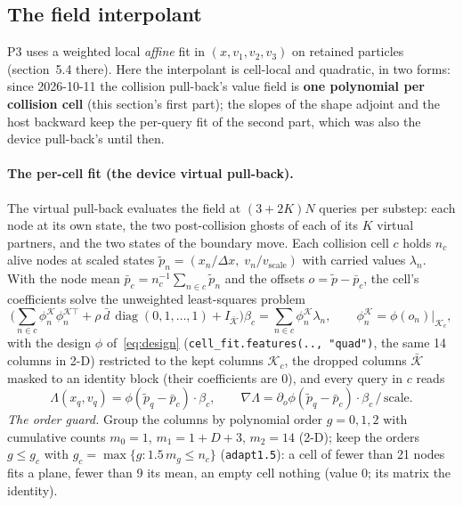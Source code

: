 \documentclass[11pt,a4paper]{article}
\numberwithin{equation}{section}
\newcommand{\code}[1]{\texttt{#1}}
\newcommand{\Lam}{\Lambda}
\begin{document}
\subsection{The field interpolant}
\label{sec:field}

P3 uses a weighted local \emph{affine} fit in $(x, v_1, v_2, v_3)$ on retained
particles (section~5.4 there).  Here the interpolant is cell-local and quadratic, in two
forms: since 2026-10-11 the collision pull-back's value field is \textbf{one polynomial per
collision cell} (this section's first part); the slopes of the shape adjoint and the host
backward keep the per-query fit of the second part, which was also the device pull-back's
until then.

\paragraph{The per-cell fit (the device virtual pull-back).}
\label{sec:field-cell}
The virtual pull-back evaluates the field at $(3+2K)N$ queries per substep: each node at its
own state, the two post-collision ghosts of each of its $K$ virtual partners, and the two
states of the boundary move.  Each collision cell $c$ holds $n_c$ alive nodes at scaled
states $\tilde p_n = (x_n/\Delta x,\; v_n/v_{\mathrm{scale}})$ with carried values $\lambda_n$.  With
the node mean $\bar p_c = n_c^{-1}\sum_{n\in c}\tilde p_n$ and the offsets $o = \tilde p - \bar p_c$, the
cell's coefficients solve the unweighted least-squares problem
\begin{equation}
\label{eq:cell-fit}
\Big(\textstyle\sum_{n \in c} \phi_n^{\mathcal K} \phi_n^{\mathcal K\top} + \rho\,\bar d\,\operatorname{diag}(0, 1, \dots, 1)
 + I_{\bar{\mathcal K}}\Big)\beta_c = \sum_{n\in c} \phi_n^{\mathcal K} \lambda_n ,
\qquad \phi_n^{\mathcal K} = \phi(o_n)\big|_{\mathcal K_c},
\end{equation}
with the design $\phi$ of~\eqref{eq:design} (\code{cell\_fit.features(.., "quad")}, the same
14 columns in 2-D) restricted to the kept columns $\mathcal K_c$, the dropped columns
$\bar{\mathcal K}$ masked to an identity block (their coefficients are $0$), and every query in
$c$ reads
\begin{equation}
\label{eq:cell-value}
\Lam(x_q, v_q) = \phi(\tilde p_q - \bar p_c)\cdot\beta_c, \qquad
\nabla \Lam = \partial_o\phi(\tilde p_q - \bar p_c)\cdot\beta_c \,/\, \mathrm{scale}.
\end{equation}
\emph{The order guard.}  Group the columns by polynomial order $g = 0, 1, 2$ with cumulative
counts $m_0 = 1$, $m_1 = 1 + D + 3$, $m_2 = 14$ (2-D); keep the orders $g \le g_c$ with
$g_c = \max\{g : 1.5\, m_g \le n_c\}$ (\code{adapt1.5}): a cell of fewer than 21 nodes fits a
plane, fewer than 9 its mean, an empty cell nothing (value $0$; its matrix the identity).
\end{document}
